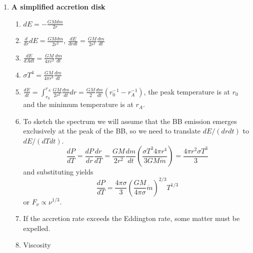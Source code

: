 \documentclass{article}
\begin{document}
\begin{enumerate}
\item{\bf A simplified accretion disk}

\begin{enumerate}
\item $dE = -\frac{G M dm}{2 r}$
\item $\frac{d}{dr} dE = \frac{G M dm}{2 r^2}$, $\frac{dE}{dr dt}=
  \frac{GM}{2 r^2} \frac{dm}{dt}$
\item $\frac{dE}{dA dt}= \frac{GM}{4 \pi r^3} \frac{dm}{dt}$
\item $\sigma T^4 =  \frac{GM}{4 \pi r^3} \frac{dm}{dt}$
\item $\frac{dE}{dt} = \int_{r_0}^{r_A}   \frac{GM}{2 r^2}
  \frac{dm}{dt} dr = \frac{GM}{2} \frac{dm}{dt} \left ( r_0^{-1} -
    r_A^{-1} \right )$, the peak temperature is at $r_0$ and the
  minimum temperature is at $r_A$.
\item To sketch the spectrum we will assume that the BB emission
  emerges exclusively at the peak of the BB, so we need to translate
  $dE/(dr dt)$ to $dE/(dT dt)$.
$$
\frac{dP}{dT} = \frac{dP}{dr} \frac{dr}{dT} = 
  \frac{GM}{2 r^2} \frac{dm}{dt} \left ( \frac{\sigma T^3 4 \pi r^4}{3
      G M {\dot m}} \right ) = \frac{4 \pi r^2 \sigma T^3}{3}
$$
and substituting yields
$$
\frac{dP}{dT} = \frac{4\pi \sigma}{3} \left ( \frac{G M}{4\pi \sigma}
  {\dot m} \right )^{2/3} T^{1/3}
$$
or $F_\nu \propto \nu^{1/3}$.
\item If the accretion rate exceeds the Eddington rate, some matter
  must be expelled.
\item Viscosity
\end{enumerate}
\end{enumerate}

\ifx\bookloaded\undefined
\end{document}
